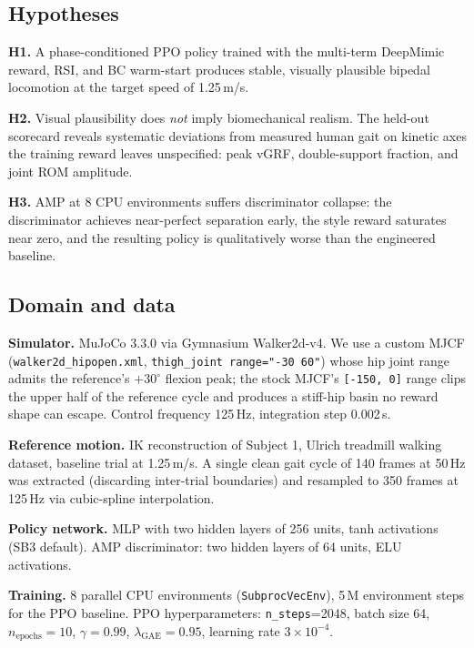 \documentclass{article}
\begin{document}
\subsection{Hypotheses}

\textbf{H1.} A phase-conditioned PPO policy trained with the multi-term DeepMimic reward, RSI, and BC warm-start produces stable, visually plausible bipedal locomotion at the target speed of 1.25\,m/s.

\textbf{H2.} Visual plausibility does \emph{not} imply biomechanical realism. The held-out scorecard reveals systematic deviations from measured human gait on kinetic axes the training reward leaves unspecified: peak vGRF, double-support fraction, and joint ROM amplitude.

\textbf{H3.} AMP at 8 CPU environments suffers discriminator collapse: the discriminator achieves near-perfect separation early, the style reward saturates near zero, and the resulting policy is qualitatively worse than the engineered baseline.

\subsection{Domain and data}

\textbf{Simulator.} MuJoCo 3.3.0 via Gymnasium Walker2d-v4. We use a custom MJCF (\texttt{walker2d\_hipopen.xml}, \texttt{thigh\_joint range="-30 60"}) whose hip joint range admits the reference's $+30^\circ$ flexion peak; the stock MJCF's \texttt{[-150, 0]} range clips the upper half of the reference cycle and produces a stiff-hip basin no reward shape can escape. Control frequency 125\,Hz, integration step 0.002\,s.

\textbf{Reference motion.} IK reconstruction of Subject 1, Ulrich treadmill walking dataset, baseline trial at 1.25\,m/s. A single clean gait cycle of 140 frames at 50\,Hz was extracted (discarding inter-trial boundaries) and resampled to 350 frames at 125\,Hz via cubic-spline interpolation.

\textbf{Policy network.} MLP with two hidden layers of 256 units, tanh activations (SB3 default). AMP discriminator: two hidden layers of 64 units, ELU activations.

\textbf{Training.} 8 parallel CPU environments (\texttt{SubprocVecEnv}), 5\,M environment steps for the PPO baseline. PPO hyperparameters: \texttt{n\_steps}=2048, batch size 64, $n_{\text{epochs}}{=}10$, $\gamma{=}0.99$, $\lambda_{\text{GAE}}{=}0.95$, learning rate $3{\times}10^{-4}$.
\end{document}
